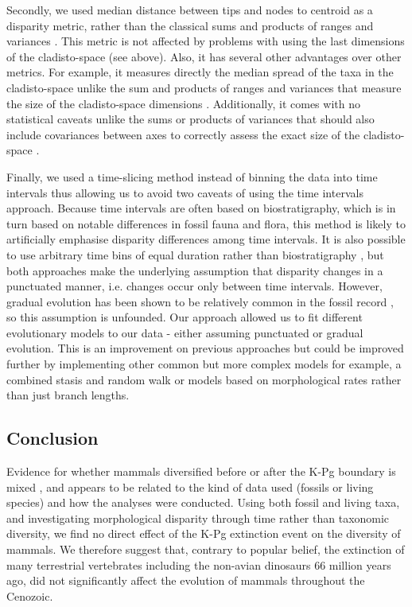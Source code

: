Secondly, we used median distance between tips and nodes to centroid as a disparity metric, rather than the classical sums and products of ranges and variances \citep{Wills1994}.
This metric is not affected by problems with using the last dimensions of the cladisto-space (see above).
Also, it has several other advantages over other metrics.
For example, it measures directly the median spread of the taxa in the cladisto-space unlike the sum and products of ranges and variances that measure the size of the cladisto-space dimensions \citep{Wills1994}.
Additionally, it comes with no statistical caveats unlike the sums or products of variances that should also include covariances between axes to correctly assess the exact size of the cladisto-space \citep[even though the covariance term is usually close to 0 because of the eigen decomposition;][]{GOWER01121966}.

Finally, we used a time-slicing method instead of binning the data into time intervals \citep[e.g in:][]{cisneros2010,prentice2011,Hughes20082013,hopkinsdecoupling2013,bentonmodels2014,bensonfaunal2014} thus allowing us to avoid two caveats of using the time intervals approach.
Because time intervals are often based on biostratigraphy, which is in turn based on notable differences in fossil fauna and flora, this method is likely to artificially emphasise disparity differences among time intervals.
It is also possible to use arbitrary time bins of equal duration rather than biostratigraphy \citep{Butler2012,hopkinsdecoupling2013,bensonfaunal2014}, but both approaches make the underlying assumption that disparity changes in a punctuated  manner, i.e. changes occur only between time intervals.
However, gradual evolution has been shown to be relatively common in the fossil record \citep{Hunt20112007,Hunt21042015}, so this assumption is unfounded.
Our approach allowed us to fit different evolutionary models to our data - either assuming punctuated or gradual evolution.
This is an improvement on previous approaches but could be improved further by implementing other common but more complex models for example, a combined stasis and random walk \citep{Hunt21042015} or models based on morphological rates rather than just branch lengths.

\subsection{Conclusion}
Evidence for whether mammals diversified before or after the K-Pg boundary is mixed \citep{meredithimpacts2011,O'Leary08022013,dosReis2014,beckancient2014}, and appears to be related to the kind of data used (fossils or living species) and how the analyses were conducted.
Using both fossil and living taxa, and investigating morphological disparity through time rather than taxonomic diversity, we find no direct effect of the K-Pg extinction event on the diversity of mammals. 
We therefore suggest that, contrary to popular belief, the extinction of many terrestrial vertebrates including the non-avian dinosaurs 66 million years ago, did not significantly affect the evolution of mammals throughout the Cenozoic.
